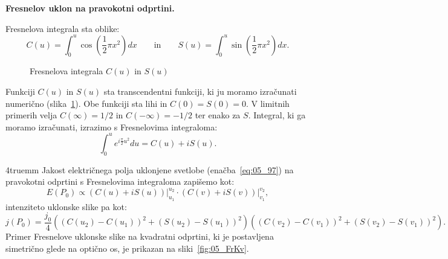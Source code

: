 \begin{example}{\bf Fresnelov uklon na pravokotni odprtini.}
\begin{remark}
Fresnelova integrala sta oblike:
\begin{equation}
C(u) = \int_0^u \cos\left(\frac{1}{2}\pi x^2\right) dx \qquad \mathrm{in} \qquad 
S(u) = \int_0^u \sin\left(\frac{1}{2}\pi x^2\right) dx. 
\label{eq:05_99}
\end{equation}
\begin{figure}[ht]
\centering
\def\svgwidth{140truemm} 

\caption{Fresnelova integrala $C(u)$ in $S(u)$}
\label{fig:05_CS}
\end{figure}
Funkciji $C(u)$ in $S(u)$ sta transcendentni funkciji, ki ju moramo izračunati 
numerično (slika~\ref{fig:05_CS}). Obe funkciji sta lihi in $C(0)=S(0)=0$. 
V limitnih primerih velja $C(\infty) = 1/2$ in $C(-\infty) = -1/2$ ter enako za $S$. 
Integral, ki ga moramo izračunati, izrazimo s Fresnelovima integraloma: 
\begin{equation}
\int_{0}^{u} e^{i\frac{\pi}{2}u^2} du = C(u)+iS(u).
\label{eq:05_100}
\end{equation}
\end{remark}
\vglue4truemm
Jakost električnega polja uklonjene svetlobe (enačba~\ref{eq:05_97}) 
na pravokotni odprtini s Fresnelovima integraloma zapišemo kot:
\begin{equation}
\left. E(P_0) \propto \left( C(u) + iS(u) \right) \right|_{u_1}^{u_2} \cdot 
\left. \left( C(v) + iS(v) \right) \right|_{v_1}^{v_2},
\label{eq:05_101}
\end{equation}
intenziteto uklonske slike pa kot:
\begin{equation}
j(P_0)  = \frac{j_0}{4} \left(\!\!\left(C(u_2) -C(u_1)\!\right)^2 + \left(S(u_2) -
S(u_1)\!\right)^2\right)\!\!
\left(\!\!\left(C(v_2) -C(v_1)\!\right)^2 + \left(S(v_2) -S(v_1)\!\right)^2\right)\!\!.
\label{eq:05_101a}
\end{equation}
Primer Fresnelove uklonske slike na kvadratni odprtini, ki je postavljena simetrično
glede na optično os, je prikazan na sliki~\ref{fig:05_FrKv}.
\begin{figure}[ht]
\centering

\end{figure}
\end{example}
